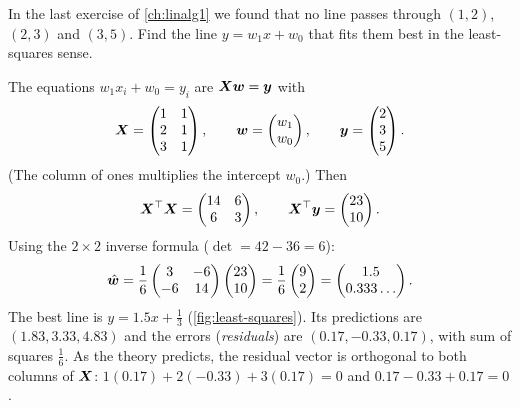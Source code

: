 \begin{example}\label{ex:least-squares}
In the last exercise of \cref{ch:linalg1} we found that no line passes through
$(1, 2)$, $(2, 3)$ and $(3, 5)$. Find the line $y = w_1x + w_0$ that fits them
best in the least-squares sense.

\sol The equations $w_1x_i + w_0 = y_i$ are $\bm{X}\bm{w} = \bm{y}$ with
\[
  \bm{X} = \begin{pmatrix} 1 & 1\\ 2 & 1\\ 3 & 1\end{pmatrix},\qquad
  \bm{w} = \begin{pmatrix} w_1\\ w_0\end{pmatrix},\qquad
  \bm{y} = \begin{pmatrix} 2\\ 3\\ 5\end{pmatrix}.
\]
(The column of ones multiplies the intercept $w_0$.) Then
\[
  \bm{X}^\top\bm{X} = \begin{pmatrix} 14 & 6\\ 6 & 3\end{pmatrix},\qquad
  \bm{X}^\top\bm{y} = \begin{pmatrix} 23\\ 10\end{pmatrix}.
\]
Using the $2\times2$ inverse formula ($\det = 42 - 36 = 6$):
\[
  \hat{\bm{w}} = \frac16\begin{pmatrix} 3 & -6\\ -6 & 14\end{pmatrix}
  \begin{pmatrix} 23\\ 10\end{pmatrix}
  = \frac16\begin{pmatrix} 9\\ 2\end{pmatrix}
  = \begin{pmatrix} 1.5\\ 0.333\ldots\end{pmatrix}.
\]
The best line is $y = 1.5x + \tfrac13$ (\cref{fig:least-squares}). Its
predictions are $(1.83, 3.33, 4.83)$ and the errors (\emph{residuals}) are
$(0.17, -0.33, 0.17)$, with sum of squares $\tfrac16$. As the theory predicts,
the residual vector is orthogonal to both columns of $\bm{X}$:
$1(0.17) + 2(-0.33) + 3(0.17) = 0$ and $0.17 - 0.33 + 0.17 = 0$.
\end{example}

